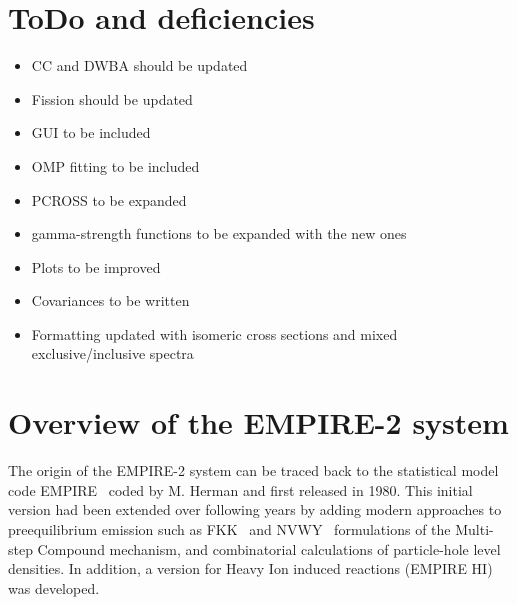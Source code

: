 \documentclass[twocolumn,amsmath,amssymb,10pt,groupedaddress,a4paper]{revtex4}
\begin{document}
\maketitle
{}
\lfoot{}
\rfoot{}
\setlength{\headrulewidth}{0.4pt}
\setlength{\footrulewidth}{0.4pt}

\newpage
\tableofcontents



\newpage
\section{ToDo and deficiencies}

\begin{itemize}
\item CC and DWBA should be updated
\item Fission should be updated
\item GUI to be included
\item OMP fitting to be included
\item PCROSS to be expanded
\item gamma-strength functions to be expanded with the new ones
\item Plots to be improved
\item Covariances to be written
\item Formatting updated with isomeric cross sections and mixed exclusive/inclusive spectra
\end{itemize}

\section{Overview of the EMPIRE-2 system}

The origin of the EMPIRE-2 system can be traced back to the statistical model
code EMPIRE~\cite{EMPIRE-I} coded by M. Herman and first released in 1980.
This initial version had been extended over following years by adding modern
approaches to preequilibrium emission such as FKK~\cite{FKK} and NVWY~\cite{NVWY}
formulations of the Multi-step Compound mechanism, and combinatorial
calculations of particle-hole level densities. In addition, a version for
Heavy Ion induced reactions (EMPIRE HI) was developed.
\end{document}
